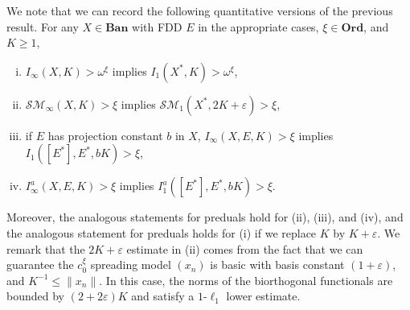 \documentclass[12pt]{amsart}
\theoremstyle{definition}
\newcommand{\ord}{\textbf{Ord}}
\newcommand{\ssm}{\mathcal{SM}}
\begin{document}
We note that we can record the following quantitative versions of the previous result.  For any $X\in \textbf{Ban}$ with FDD $E$ in the appropriate cases, $\xi\in \ord$, and $K\geqslant 1$, \begin{enumerate}[(i)]\item $I_\infty(X, K)>\omega^\xi$ implies $I_1(X^*, K)>\omega^\xi$, \item $\ssm_\infty(X, K)>\xi$ implies $\ssm_1(X^*, 2K+\varepsilon)>\xi$, \item if $E$ has projection constant $b$ in $X$, $I_\infty(X,E,K)>\xi$ implies $I_1([E^*], E^*, bK)>\xi$, \item $I^a_\infty(X,E,K)>\xi$ implies $I^a_1([E^*], E^*, bK)>\xi$. \end{enumerate} Moreover, the analogous statements for preduals hold for (ii), (iii), and (iv), and the analogous statement for preduals holds for (i) if we replace $K$ by $K+\varepsilon$.  We remark that the $2K+\varepsilon$ estimate in (ii) comes from the fact that we can guarantee the $c_0^\xi$ spreading model $(x_n)$ is basic with basis constant $(1+\varepsilon)$, and $K^{-1}\leqslant \|x_n\|$.  In this case, the norms of the biorthogonal functionals are bounded by $(2+2\varepsilon)K$ and satisfy a $1$-$\ell_1$ lower estimate.  
\end{document}

